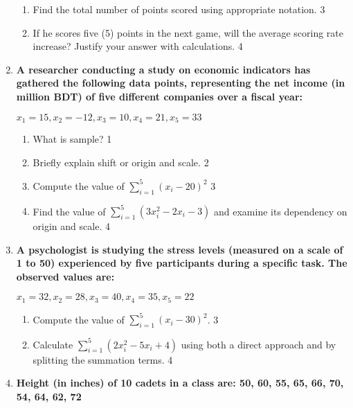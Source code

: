 \documentclass[a4paper,oneside]{book}
\begin{document}
\begin{enumerate}
\begin{enumerate}
    \item  
    Find the total number of points scored using appropriate notation. \hfill 3
    \item
    If he scores five (5) points in the next game, will the average scoring rate increase? Justify your answer with calculations. \hfill 4
\end{enumerate}

  
    \item  
	  \textbf{A researcher conducting a study on economic indicators has gathered the following data points, representing the net income (in million BDT) of five different companies over a fiscal year:}  
	  
	  \begin{center}  
	  $x_1=15, x_2=-12, x_3=10, x_4=21, x_5=33$  
	  \end{center} 
  \begin{enumerate}
    \item
	What is sample? \hfill 1
    \item
	Briefly explain shift or origin and scale. \hfill 2
    \item  
	Compute the value of $\displaystyle \sum_{i=1}^5 (x_i-20)^2$ \hfill 3
    \item
	Find the value of $\displaystyle \sum_{i=1}^5 (3x_i^2-2x_i-3)$ and examine its dependency on origin and scale. \hfill 4
  \end{enumerate} 
  
  \item
\textbf{A psychologist is studying the stress levels (measured on a scale 
of 1 to 50) experienced by five participants during a specific task. 
The observed values are:}
\begin{center}
$x_1 = 32, x_2 = 28, x_3 = 40, x_4 = 35, x_5 = 22$
\end{center}
\begin{enumerate}
    \item
    Compute the value of $\displaystyle \sum_{i=1}^5 (x_i - 30)^2$. \hfill 3
    \item
    Calculate $\displaystyle \sum_{i=1}^5 (2x_i^2 - 5x_i + 4)$ using both a direct approach and by splitting the summation terms. \hfill 4
\end{enumerate}


 \item
	  \textbf{Height (in inches) of 10 cadets in a class are: 50, 60, 55, 65, 66, 70, 54, 64, 62, 72} 
	 

\end{enumerate}
\end{document}
